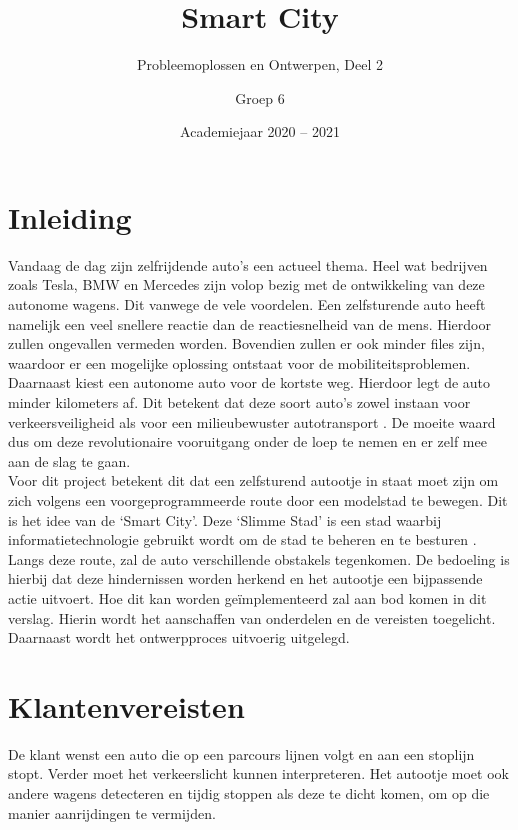 \documentclass[a4paper,twoside,kulak]{kulakreport} %
\title{Smart City}
\subtitle{Probleemoplossen en Ontwerpen, Deel 2}
\author{Groep 6}
\institute {Aaron Vandenberghe, Dieter Demuynck, Jolien Barbier\\  
	Mathis Bossuyt, Rani Jans en Sarah De Meester \\~\\ 
	o.l.v. Benjamin Maveau Kevin Truyaert en Martijn Boussé}
\date{Academiejaar 2020 -- 2021}
\begin{document}

\titlepage 
\tableofcontents
\renewcommand\thesection{\arabic{section}}
\renewcommand\thesubsection{\thesection.\arabic{subsection}}
\newpage
\section*{Inleiding}\label{Inleiding}
Vandaag de dag zijn zelfrijdende auto's een actueel thema. Heel wat bedrijven zoals Tesla, BMW en Mercedes zijn volop bezig met de ontwikkeling van deze autonome wagens. Dit vanwege de vele voordelen. Een zelfsturende auto heeft namelijk een veel snellere reactie dan de reactiesnelheid van de mens. Hierdoor zullen ongevallen vermeden worden. Bovendien zullen er ook minder files zijn, waardoor er een mogelijke oplossing ontstaat voor de mobiliteitsproblemen. Daarnaast kiest een autonome auto voor de kortste weg. Hierdoor legt de auto minder kilometers af. Dit betekent dat deze soort auto's zowel instaan voor verkeersveiligheid als voor een milieubewuster autotransport \cite{AutonomeAutos1, AutonomeAutos2}. De moeite waard dus om deze revolutionaire vooruitgang onder de loep te nemen en er zelf mee aan de slag te gaan.\\
Voor dit project betekent dit dat een zelfsturend autootje in staat moet zijn om zich volgens een voorgeprogrammeerde route door een modelstad te bewegen. Dit is het idee van de `Smart City'. Deze `Slimme Stad' is een stad waarbij informatietechnologie gebruikt wordt om de stad te beheren en te besturen \cite{SmartCity}. Langs deze route, zal de auto verschillende obstakels tegenkomen. De bedoeling is hierbij dat deze hindernissen worden herkend en het autootje een bijpassende actie uitvoert. Hoe dit kan worden geïmplementeerd zal aan bod komen in dit verslag. Hierin wordt het aanschaffen van onderdelen en de vereisten toegelicht. Daarnaast wordt het ontwerpproces uitvoerig uitgelegd. 


\section{Klantenvereisten} \label{Klantenvereisten}
De klant wenst een auto die op een parcours lijnen volgt en aan een stoplijn stopt. Verder moet het verkeerslicht kunnen interpreteren. Het autootje moet ook andere wagens detecteren en tijdig stoppen als deze te dicht komen, om op die manier aanrijdingen te vermijden. 
\end{document}
